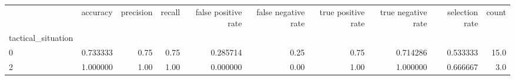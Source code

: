 \begin{tabular}{lrrrrrrrrr}
\toprule
{} &  accuracy &  precision &  recall &  false positive rate &  false negative rate &  true positive rate &  true negative rate &  selection rate &  count \\
tactical\_situation &           &            &         &                      &                      &                     &                     &                 &        \\
\midrule
0                  &  0.733333 &       0.75 &    0.75 &             0.285714 &                 0.25 &                0.75 &            0.714286 &        0.533333 &   15.0 \\
2                  &  1.000000 &       1.00 &    1.00 &             0.000000 &                 0.00 &                1.00 &            1.000000 &        0.666667 &    3.0 \\
\bottomrule
\end{tabular}
